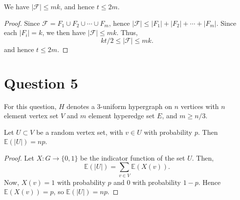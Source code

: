\documentclass{unswmaths}
\begin{document}
\begin{corollary}[Part (c)]
    We have $|\mathcal{F}| \leq mk$, and hence $t \leq 2m$.
\end{corollary}
\begin{proof}
    Since $\mathcal{F} = F_1\cup F_2\cup\cdots\cup F_m$, hence $|\mathcal{F}| \leq |F_1|+|F_2|+\cdots+|F_m|$. 
    Since each $|F_i| = k$, we then have $|\mathcal{F}| \leq mk$. 
    Thus,
    \begin{equation*}
        kt/2 \leq |\mathcal{F}| \leq mk.
    \end{equation*}
    and hence $t \leq 2m$. 
\end{proof}


\section*{Question 5}

For this question, $H$ denotes a $3$-uniform hypergraph
on $n$ vertices with $n$ element vertex set $V$
and $m$ element hyperedge set $E$, and $m \geq n/3$.

\begin{lemma}[Part (a)]
    \label{5a}
    Let $U \subset V$ be a random vertex set, with $v \in U$
    with probability $p$. Then $\mathbb{E}(|U|) = np$.
\end{lemma}
\begin{proof}
    Let $X:G\to \{0,1\}$ be the indicator function of the set $U$.
    Then,
    \begin{equation*}
        \mathbb{E}(|U|) = \sum_{v \in V} \mathbb{E}(X(v)).
    \end{equation*}
    Now, $X(v) = 1$ with probability $p$ and $0$ with probability $1-p$.
    Hence $\mathbb{E}(X(v)) = p$, so $\mathbb{E}(|U|) = np$.
\end{proof}
\end{document}

